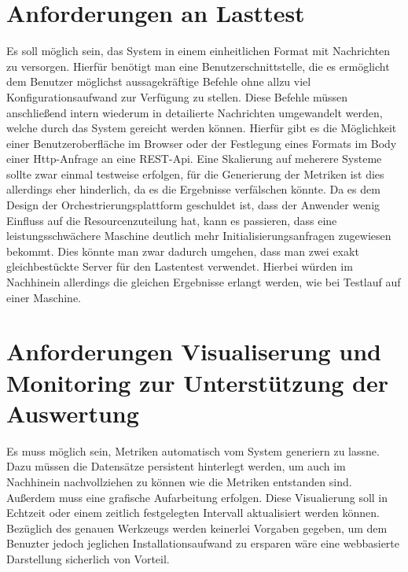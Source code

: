 \section{Anforderungen an Lasttest}
Es soll möglich sein, das System in einem einheitlichen Format mit Nachrichten zu versorgen. Hierfür benötigt man eine Benutzerschnittstelle, die es ermöglicht dem Benutzer möglichst aussagekräftige Befehle ohne allzu viel Konfigurationsaufwand zur Verfügung zu stellen. Diese Befehle müssen anschließend intern wiederum in detailierte Nachrichten umgewandelt werden, welche durch das System gereicht werden können. Hierfür gibt es die Möglichkeit einer Benutzeroberfläche im Browser oder der Festlegung eines Formats im Body einer Http-Anfrage an eine REST-Api. Eine Skalierung auf meherere Systeme sollte zwar einmal testweise erfolgen, für die Generierung der Metriken ist dies allerdings eher hinderlich, da es die Ergebnisse verfälschen könnte. Da es dem Design der Orchestrierungsplattform geschuldet ist, dass der Anwender wenig Einfluss auf die Resourcenzuteilung hat, kann es passieren, dass eine leistungsschwächere Maschine deutlich mehr Initialisierungsanfragen zugewiesen bekommt. Dies könnte man zwar dadurch umgehen, dass man zwei exakt gleichbestückte Server für den Lastentest verwendet. Hierbei würden im Nachhinein allerdings die gleichen Ergebnisse erlangt werden, wie bei Testlauf auf einer Maschine.

\section{Anforderungen Visualiserung und Monitoring zur Unterstützung der Auswertung}
Es muss möglich sein, Metriken automatisch vom System generiern zu lassne. Dazu müssen die Datensätze persistent hinterlegt werden, um auch im Nachhinein nachvollziehen zu können wie die Metriken entstanden sind. Außerdem muss eine grafische Aufarbeitung erfolgen. Diese Visualierung soll in Echtzeit oder einem zeitlich festgelegten Intervall aktualisiert werden können. Bezüglich des genauen Werkzeugs werden keinerlei Vorgaben gegeben, um dem Benuzter jedoch jeglichen Installationsaufwand zu ersparen wäre eine webbasierte Darstellung sicherlich von Vorteil.
